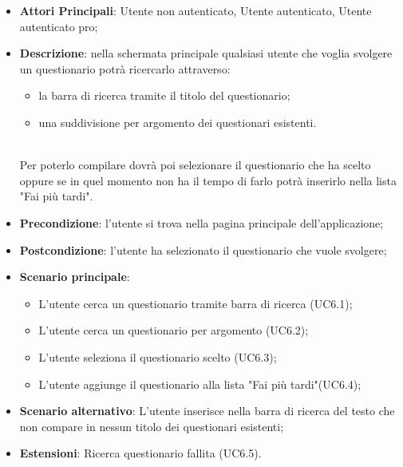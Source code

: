 \begin{itemize}
\item\textbf{Attori Principali}: Utente non autenticato, Utente autenticato, Utente autenticato pro;
\item\textbf{Descrizione}: nella schermata principale qualsiasi utente che voglia svolgere un questionario potrà ricercarlo attraverso:
\begin{itemize}
\item la barra di ricerca tramite il titolo del questionario;
\item una suddivisione per argomento dei questionari esistenti.
\end{itemize}
\\Per poterlo compilare dovrà poi selezionare il questionario che ha scelto oppure se in quel momento non ha il tempo di farlo potrà inserirlo nella lista "Fai più tardi".	
\item\textbf{Precondizione}: l'utente si trova nella pagina principale dell'applicazione;
\item\textbf{Postcondizione}: l'utente ha selezionato il questionario che vuole svolgere;
\item\textbf{Scenario principale}:
\begin{itemize}
\item L'utente cerca un questionario tramite barra di ricerca (UC6.1);
\item L'utente cerca un questionario per argomento (UC6.2);
\item L'utente seleziona il questionario scelto (UC6.3);
\item L'utente aggiunge il questionario alla lista "Fai più tardi"(UC6.4);
\end{itemize}
\item\textbf{Scenario alternativo}: L'utente inserisce nella barra di ricerca del testo che non compare in nessun titolo dei questionari esistenti;
\item\textbf{Estensioni}: Ricerca questionario fallita (UC6.5).
\end{itemize}

